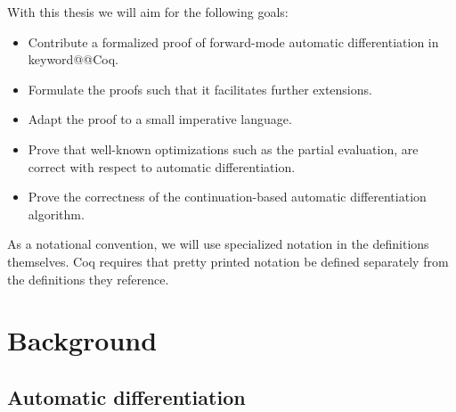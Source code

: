 \documentclass[12pt, final]{article}
\makeatletter
\def\<#1>{\csname keyword@@#1\endcsname}
\makeatother
\begin{document}
With this thesis we will aim for the following goals:
\begin{itemize}
  \item Contribute a formalized proof of forward-mode automatic differentiation in \<Coq>.
  \item Formulate the proofs such that it facilitates further extensions.
  \item Adapt the proof to a small imperative language.
  \item Prove that well-known optimizations such as the partial evaluation, are correct with respect to automatic differentiation.
  \item Prove the correctness of the continuation-based automatic differentiation algorithm.
\end{itemize}


As a notational convention, we will use specialized notation in the definitions themselves. Coq requires that pretty printed notation be defined separately from the definitions they reference.

\section{Background}

\subsection{Automatic differentiation}
\end{document}
